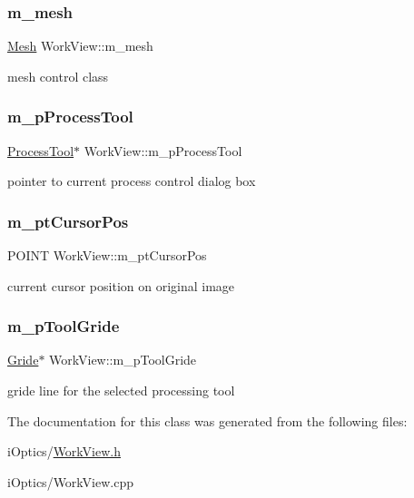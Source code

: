 \subsubsection{\texorpdfstring{m\+\_\+mesh}{m\_mesh}}
{\footnotesize\ttfamily \mbox{\hyperlink{class_mesh}{Mesh}} Work\+View\+::m\+\_\+mesh\hspace{0.3cm}{\ttfamily [protected]}}

mesh control class \mbox{\label{class_work_view_ae70044302a41f2ad4315159eb07c6451}} 
\subsubsection{\texorpdfstring{m\+\_\+p\+Process\+Tool}{m\_pProcessTool}}
{\footnotesize\ttfamily \mbox{\hyperlink{class_process_tool}{Process\+Tool}}$\ast$ Work\+View\+::m\+\_\+p\+Process\+Tool\hspace{0.3cm}{\ttfamily [protected]}}

pointer to current process control dialog box \mbox{\label{class_work_view_ac4c6b3ea30ed20afd8fc96dc9be9a5b6}} 
\subsubsection{\texorpdfstring{m\+\_\+pt\+Cursor\+Pos}{m\_ptCursorPos}}
{\footnotesize\ttfamily P\+O\+I\+NT Work\+View\+::m\+\_\+pt\+Cursor\+Pos}

current cursor position on original image \mbox{\label{class_work_view_a9e286bc84a23735521f04f1c93598a07}} 
\subsubsection{\texorpdfstring{m\+\_\+p\+Tool\+Gride}{m\_pToolGride}}
{\footnotesize\ttfamily \mbox{\hyperlink{class_gride}{Gride}}$\ast$ Work\+View\+::m\+\_\+p\+Tool\+Gride\hspace{0.3cm}{\ttfamily [protected]}}

gride line for the selected processing tool 

The documentation for this class was generated from the following files\+:\begin{DoxyCompactItemize}
\item 
i\+Optics/\mbox{\hyperlink{_work_view_8h}{Work\+View.\+h}}\item 
i\+Optics/Work\+View.\+cpp\end{DoxyCompactItemize}
